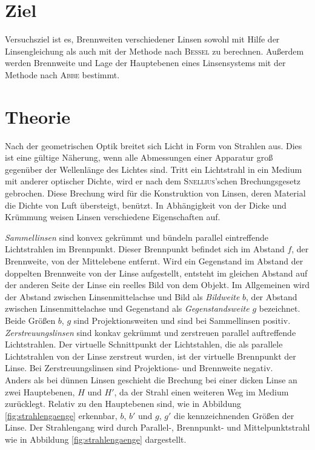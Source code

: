 \section{Ziel}
\label{sec:Ziel}

Versuchsziel ist es, Brennweiten verschiedener Linsen sowohl mit Hilfe der Linsengleichung als auch mit der Methode nach \textsc{Bessel} zu berechnen. 
Außerdem werden Brennweite und Lage der Hauptebenen eines Linsensystems mit der Methode nach \textsc{Abbe} bestimmt.
\section{Theorie}
\label{sec:theorie}
Nach der geometrischen Optik breitet sich Licht in Form von Strahlen aus. 
Dies ist eine gültige Näherung, wenn alle Abmessungen einer Apparatur groß gegenüber der Wellenlänge des Lichtes sind. 
Tritt ein Lichtstrahl in ein Medium mit anderer optischer Dichte, wird er nach dem \textsc{Snellius}'schen Brechungsgesetz gebrochen. 
Diese Brechung wird für die Konstruktion von Linsen, deren Material die Dichte von Luft übersteigt, benützt.
In Abhängigkeit von der Dicke und Krümmung weisen Linsen verschiedene Eigenschaften auf. 

\emph{Sammellinsen} sind konvex gekrümmt und bündeln parallel eintreffende Lichtstrahlen im Brennpunkt. Dieser Brennpunkt befindet sich im Abstand $f$, der Brennweite, von der Mittelebene entfernt. 
Wird ein Gegenstand im Abstand der doppelten Brennweite von der Linse aufgestellt, entsteht im gleichen Abstand auf der anderen Seite der Linse ein reelles Bild von dem Objekt. 
Im Allgemeinen wird der Abstand zwischen Linsenmittelachse und Bild als \emph{Bildweite} $b$, der Abstand zwischen Linsenmittelachse und Gegenstand als \emph{Gegenstandsweite} $g$ bezeichnet. 
Beide Größen $b$, $g$ sind Projektionsweiten und sind bei Sammellinsen positiv.\\
\emph{Zerstreuungslinsen} sind konkav gekrümmt und zerstreuen parallel auftreffende Lichtstrahlen. 
Der virtuelle Schnittpunkt der Lichtstahlen, die als parallele Lichtstrahlen von der Linse zerstreut wurden, ist der virtuelle Brennpunkt der Linse.
Bei Zerstreuungslinsen sind Projektions- und Brennweite negativ.\\
Anders als bei dünnen Linsen geschieht die Brechung bei einer dicken Linse an zwei Hauptebenen, $H$ und $H'$, da der Strahl einen weiteren Weg im Medium zurücklegt.
Relativ zu den Hauptebenen sind, wie in Abbildung \ref{fig:strahlengaenge} erkennbar, $b$, $b'$ und $g$, $g'$ die kennzeichnenden Größen der Linse. 
Der Strahlengang wird durch Parallel-, Brennpunkt- und Mittelpunktstrahl wie in Abbildung \ref{fig:strahlengaenge} dargestellt.

